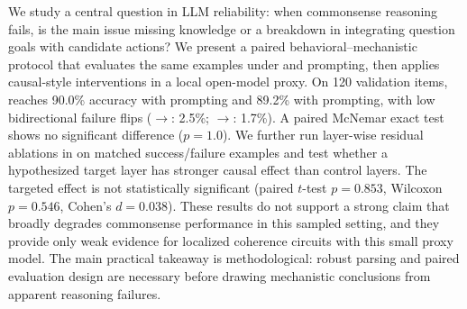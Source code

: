 We study a central question in LLM reliability: when commonsense reasoning fails, is the main issue missing knowledge or a breakdown in integrating question goals with candidate actions? We present a paired behavioral--mechanistic protocol that evaluates the same \csqa examples under \direct and \cotprompt prompting, then applies causal-style interventions in a local open-model proxy. On 120 validation items, \gptapi reaches 90.0\% accuracy with \direct prompting and 89.2\% with \cotprompt prompting, with low bidirectional failure flips (\direct$\rightarrow$\cotprompt: 2.5\%; \cotprompt$\rightarrow$\direct: 1.7\%). A paired McNemar exact test shows no significant difference ($p=1.0$). We further run layer-wise residual ablations in \proxy on matched success/failure examples and test whether a hypothesized target layer has stronger causal effect than control layers. The targeted effect is not statistically significant (paired $t$-test $p=0.853$, Wilcoxon $p=0.546$, Cohen's $d=0.038$). These results do not support a strong claim that \cotprompt broadly degrades commonsense performance in this sampled setting, and they provide only weak evidence for localized coherence circuits with this small proxy model. The main practical takeaway is methodological: robust parsing and paired evaluation design are necessary before drawing mechanistic conclusions from apparent reasoning failures.

